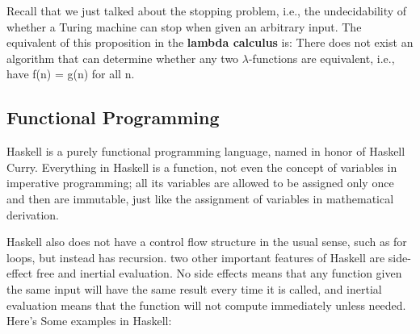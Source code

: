 \documentclass[a4paper]{article}
\theoremstyle{definition}
\begin{document}
Recall that we just talked about the stopping problem, i.e., the undecidability of whether a Turing machine can stop when given an arbitrary input.
The equivalent of this proposition in the \textbf{lambda calculus} is: There does not exist an algorithm that can determine whether any two $\lambda$-functions are equivalent, i.e., have f(n) = g(n) for all n.

\subsection{Functional Programming}

Haskell is a purely functional programming language, named in honor of Haskell Curry. Everything in Haskell is a function, not even the concept of variables in imperative programming; all its variables are allowed to be assigned only once and then are immutable, just like the assignment of variables in mathematical derivation.

Haskell also does not have a control flow structure in the usual sense, such as for loops, but instead has recursion. two other important features of Haskell are side-effect free and inertial evaluation. No side effects means that any function given the same input will have the same result every time it is called, and inertial evaluation means that the function will not compute immediately unless needed. Here's Some examples in Haskell:
\end{document}
